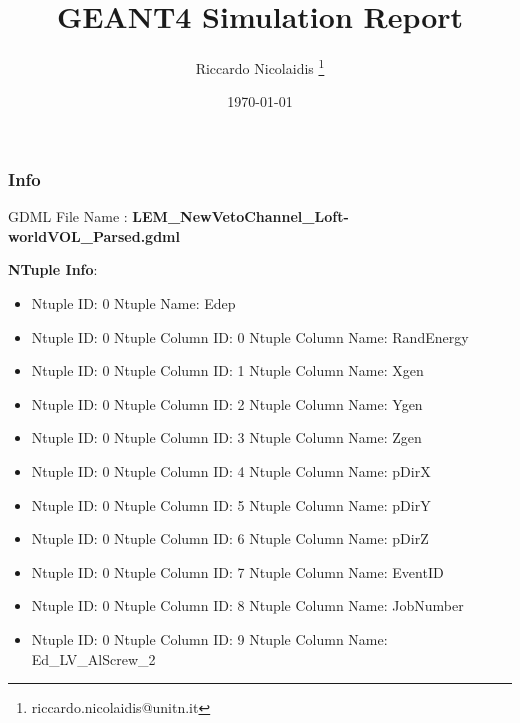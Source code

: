 \documentclass[8pt]{beamer}
\title{GEANT4 Simulation Report}
\author{Riccardo Nicolaidis \footnote{riccardo.nicolaidis@unitn.it}}
\date{\today}
\begin{document}
        
            \begin{frame}
                \titlepage
            \end{frame}
            
            \begin{frame}
                \frametitle{Info}
            
                \centering
                GDML File Name : \textbf{ LEM\_NewVetoChannel\_Loft-worldVOL\_Parsed.gdml}
                
                
                \vspace{2 cm}
                \textbf{NTuple Info}:
                \vspace{1 cm}
                
        \begin{itemize}
        
        \item Ntuple ID: 0 Ntuple Name: Edep
        
        \item Ntuple ID: 0 Ntuple Column ID: 0 Ntuple Column Name: RandEnergy
        
        \item Ntuple ID: 0 Ntuple Column ID: 1 Ntuple Column Name: Xgen
        
        \item Ntuple ID: 0 Ntuple Column ID: 2 Ntuple Column Name: Ygen
        
        \item Ntuple ID: 0 Ntuple Column ID: 3 Ntuple Column Name: Zgen
        
        \item Ntuple ID: 0 Ntuple Column ID: 4 Ntuple Column Name: pDirX
        
        \item Ntuple ID: 0 Ntuple Column ID: 5 Ntuple Column Name: pDirY
        
        \item Ntuple ID: 0 Ntuple Column ID: 6 Ntuple Column Name: pDirZ
        
        \item Ntuple ID: 0 Ntuple Column ID: 7 Ntuple Column Name: EventID
        
        \item Ntuple ID: 0 Ntuple Column ID: 8 Ntuple Column Name: JobNumber
        
        \item Ntuple ID: 0 Ntuple Column ID: 9 Ntuple Column Name: Ed\_LV\_AlScrew\_2
        

\end{itemize}
\end{frame}
\end{document}
